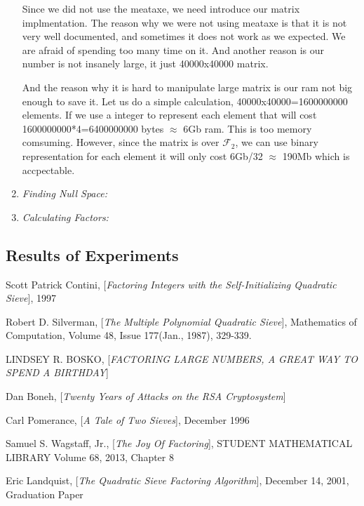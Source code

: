 \documentclass[12pt]{article} %
\begin{document}
\begin{enumerate}
Since we did not use the meataxe, we need introduce our matrix implmentation. The reason why we were not using meataxe is that it is not very well documented, and sometimes it does not work as we expected. We are afraid of spending too many time on it. And another reason is our number is not insanely large, it just 40000x40000 matrix. 

And the reason why it is hard to manipulate large matrix is our ram not big enough to save it. Let us do a simple calculation, 40000x40000=1600000000 elements. If we use a integer to represent each element that will cost 1600000000*4=6400000000 bytes $\approx$ 6Gb ram. This is too memory comsuming. However, since the matrix is over $\mathcal{F}_2$, we can use binary representation for each element it will only cost 6Gb/32 $\approx$ 190Mb which is accpectable. 

\item \textit{Finding Null Space:}

\lipsum[1-2]

\item \textit{Calculating Factors:}

\lipsum[3-5]

\end{enumerate}

\subsection {Results of Experiments}

\pagebreak
\begin{thebibliography}{99}

 Scott Patrick Contini, [\textit{Factoring Integers with the Self-Initializing Quadratic Sieve}], 1997

 Robert D. Silverman, [\textit{The Multiple Polynomial Quadratic Sieve}], Mathematics of Computation, Volume 48, Issue 177(Jan., 1987), 329-339.

 LINDSEY R. BOSKO, [\textit{FACTORING LARGE NUMBERS, A GREAT WAY TO SPEND A BIRTHDAY}]

 Dan Boneh, [\textit{Twenty Years of Attacks on the RSA Cryptosystem}]

 Carl Pomerance, [\textit{A Tale of Two Sieves}], December 1996

 Samuel S. Wagstaff, Jr., [\textit{The Joy Of Factoring}], STUDENT MATHEMATICAL LIBRARY Volume 68, 2013, Chapter 8

 Eric Landquist, [\textit{The Quadratic Sieve Factoring Algorithm}], December 14, 2001, Graduation Paper


\end{thebibliography}

 
\end{document}
